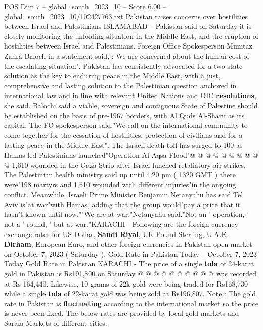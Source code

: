 \begin{textsample}{POS Dim 7 – global\_south\_2023\_10 – Score 6.00 – global\_south\_2023\_10/102427763.txt}  \label{ex:f7_pos_130}
Pakistan raises concerns over hostilities between Israel and Palestinians ISLAMABAD -- Pakistan said on Saturday it is closely monitoring the unfolding situation in the Middle East, and the eruption of hostilities between Israel and Palestinians.
Foreign Office Spokesperson Mumtaz Zahra Baloch in a statement said, : We are concerned about the human cost of the escalating situation".
Pakistan has consistently advocated for a two-state solution as the key to enduring peace in the Middle East, with a just, comprehensive and lasting solution to the Palestinian question anchored in international law and in line with relevant United Nations and OIC \textbf{resolutions}, she said.
Balochi said a viable, sovereign and contiguous State of Palestine should be established on the basis of pre-1967 borders, with Al Quds Al-Sharif as its capital.
The FO spokesperson said,"We call on the international community to come together for the cessation of hostilities, protection of civilians and for a lasting peace in the Middle East".
The Israeli death toll has surged to 100 as Hamas-led Palestinians launched"Operation Al-Aqsa Flood"@ @ @ @ @ @ @ @ @ @ 1,610 wounded in the Gaza Strip after Israel lunched retaliatory air strikes.
The Palestinian health ministry said up until 4:20 pm ( 1320 GMT ) there were"198 martyrs and 1,610 wounded with different injuries"in the ongoing conflict.
Meanwhile, Israeli Prime Minister Benjamin Netanyahu has said Tel Aviv is"at war"with Hamas, adding that the group would"pay a price that it hasn't known until now.""We are at war,"Netanyahu said."Not an ' operation, ' not a ' round, ' but at war."KARACHI - Following are the foreign currency exchange rates for US Dollar, \textbf{Saudi} \textbf{Riyal}, UK Pound Sterling, U.A.E. \textbf{Dirham}, European Euro, and other foreign currencies in Pakistan open market on October 7, 2023 ( Saturday ).
Gold Rate in Pakistan Today -- October 7, 2023 Today Gold Rate in Pakistan KARACHI - The price of a single \textbf{tola} of 24-karat gold in Pakistan is Rs191,800 on Saturday @ @ @ @ @ @ @ @ @ @ was recorded at Rs 164,440.
Likewise, 10 grams of 22k gold were being traded for Rs168,730 while a single \textbf{tola} of 22-karat gold was being sold at Rs196,807.
Note : The gold rate in Pakistan is \textbf{fluctuating} according to the international market so the price is never been fixed.
The below rates are provided by local gold markets and Sarafa Markets of different cities.

\end{textsample}
